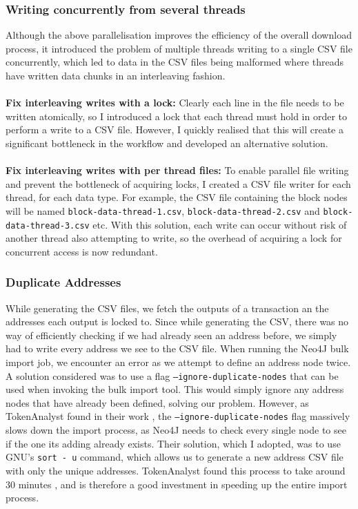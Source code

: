 \subsubsection{Writing concurrently from several threads}
Although the above parallelisation improves the efficiency of the overall download process, it introduced the problem of multiple threads writing to a single CSV file concurrently, which led to data in the CSV files being malformed where threads have written data chunks in an interleaving fashion. 
\\\\
\textbf{Fix interleaving writes with a lock:} Clearly each line in the file needs to be written atomically, so I introduced a lock that each thread must hold in order to perform a write to a CSV file. However, I quickly realised that this will create a significant bottleneck in the workflow and developed an alternative solution.
\\\\
\textbf{Fix interleaving writes with per thread files:} To enable parallel file writing and prevent the bottleneck of acquiring locks, I created a CSV file writer for each thread, for each data type. For example, the CSV file containing the block nodes will be named \texttt{block-data-thread-1.csv}, \texttt{block-data-thread-2.csv} and \texttt{block-data-thread-3.csv} etc. With this solution, each write can occur without risk of another thread also attempting to write, so the overhead of acquiring a lock for concurrent access is now redundant. 

\subsubsection{Duplicate Addresses}
While generating the CSV files, we fetch the outputs of a transaction an the addresses each output is locked to. Since while generating the CSV, there was no way of efficiently checking if we had already seen an address before, we simply had to write every address we see to the CSV file. When running the Neo4J bulk import job, we encounter an error as we attempt to define an address node twice. A solution considered was to use a flag \texttt{--ignore-duplicate-nodes} that can be used when invoking the bulk import tool. This would simply ignore any address nodes that have already been defined, solving our problem. However, as TokenAnalyst found in their work \cite{RefWorks:doc:5c98e0cde4b044512c0b8641}, the \texttt{--ignore-duplicate-nodes} flag massively slows down the import process, as Neo4J needs to check every single node to see if the one its adding already exists. Their solution, which I adopted, was to use GNU's \texttt{sort - u} command, which allows us to generate a new address CSV file with only the unique addresses. TokenAnalyst found this process to take around 30 minutes \cite{RefWorks:doc:5c98e0cde4b044512c0b8641}, and is therefore a good investment in speeding up the entire import process. 

